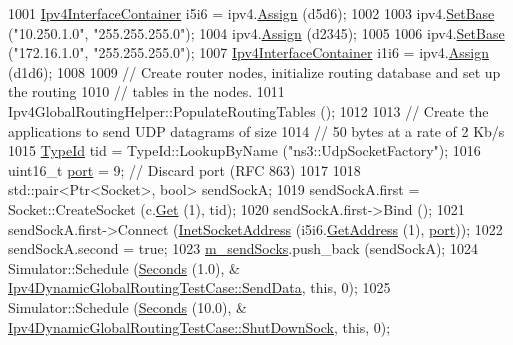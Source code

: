 \begin{DoxyCode}
1001   \hyperlink{classns3_1_1Ipv4InterfaceContainer}{Ipv4InterfaceContainer} i5i6 = ipv4.\hyperlink{classns3_1_1Ipv4AddressHelper_af8e7f4a1a7e74c00014a1eac445a27af}{Assign} (d5d6);
1002 
1003   ipv4.\hyperlink{classns3_1_1Ipv4AddressHelper_acf7b16dd25bac67e00f5e25f90a9a035}{SetBase} (\textcolor{stringliteral}{"10.250.1.0"}, \textcolor{stringliteral}{"255.255.255.0"});
1004   ipv4.\hyperlink{classns3_1_1Ipv4AddressHelper_af8e7f4a1a7e74c00014a1eac445a27af}{Assign} (d2345);
1005 
1006   ipv4.\hyperlink{classns3_1_1Ipv4AddressHelper_acf7b16dd25bac67e00f5e25f90a9a035}{SetBase} (\textcolor{stringliteral}{"172.16.1.0"}, \textcolor{stringliteral}{"255.255.255.0"});
1007   \hyperlink{classns3_1_1Ipv4InterfaceContainer}{Ipv4InterfaceContainer} i1i6 = ipv4.\hyperlink{classns3_1_1Ipv4AddressHelper_af8e7f4a1a7e74c00014a1eac445a27af}{Assign} (d1d6);
1008 
1009   \textcolor{comment}{// Create router nodes, initialize routing database and set up the routing}
1010   \textcolor{comment}{// tables in the nodes.}
1011   Ipv4GlobalRoutingHelper::PopulateRoutingTables ();
1012 
1013   \textcolor{comment}{// Create the applications to send UDP datagrams of size}
1014   \textcolor{comment}{// 50 bytes at a rate of 2 Kb/s}
1015   \hyperlink{classns3_1_1TypeId}{TypeId} tid = TypeId::LookupByName (\textcolor{stringliteral}{"ns3::UdpSocketFactory"});
1016   uint16\_t \hyperlink{dsdv-manet_8cc_a8e0798404bf2cf5dabb84c5ba9a4f236}{port} = 9;   \textcolor{comment}{// Discard port (RFC 863)}
1017 
1018   std::pair<Ptr<Socket>, \textcolor{keywordtype}{bool}>  sendSockA;
1019   sendSockA.first = Socket::CreateSocket (c.\hyperlink{classns3_1_1NodeContainer_a9ed96e2ecc22e0f5a3d4842eb9bf90bf}{Get} (1), tid);
1020   sendSockA.first->Bind ();
1021   sendSockA.first->Connect (\hyperlink{classns3_1_1InetSocketAddress}{InetSocketAddress} (i5i6.\hyperlink{classns3_1_1Ipv4InterfaceContainer_ae63208dcd222be986822937ee4aa828c}{GetAddress} (1), 
      \hyperlink{dsdv-manet_8cc_a8e0798404bf2cf5dabb84c5ba9a4f236}{port}));
1022   sendSockA.second = \textcolor{keyword}{true};
1023   \hyperlink{classIpv4DynamicGlobalRoutingTestCase_ab5c3600b2f8c2e1fa3b91977e7d4a3d0}{m\_sendSocks}.push\_back (sendSockA);
1024   Simulator::Schedule (\hyperlink{group__timecivil_ga33c34b816f8ff6628e33d5c8e9713b9e}{Seconds} (1.0), &
      \hyperlink{classIpv4DynamicGlobalRoutingTestCase_ae9f0be02edbbc7b33856d1b89b1881e2}{Ipv4DynamicGlobalRoutingTestCase::SendData}, \textcolor{keyword}{this}, 0);
1025   Simulator::Schedule (\hyperlink{group__timecivil_ga33c34b816f8ff6628e33d5c8e9713b9e}{Seconds} (10.0), &
      \hyperlink{classIpv4DynamicGlobalRoutingTestCase_ae7148ddfaf88bcc3694de3d2271b727d}{Ipv4DynamicGlobalRoutingTestCase::ShutDownSock}, \textcolor{keyword}{this}, 0);

\end{DoxyCode}
